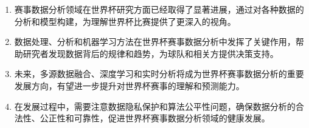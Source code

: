 \documentclass{beamer}
\begin{document}
	
			\begin{frame}
				\begin{enumerate}[label=\arabic*.]
					\item 赛事数据分析领域在世界杯研究方面已经取得了显著进展，通过对各种数据的分析和模型构建，为理解世界杯比赛提供了更深入的视角。
					\item 数据处理、分析和机器学习方法在世界杯赛事数据分析中发挥了关键作用，帮助研究者发现数据背后的规律和趋势，为球队和相关方提供决策支持。
					\item 未来，多源数据融合、深度学习和实时分析将成为世界杯赛事数据分析的重要发展方向，有望进一步提升对世界杯赛事的理解和预测能力。
					\item 在发展过程中，需要注意数据隐私保护和算法公平性问题，确保数据分析的合法性、公正性和可靠性，促进世界杯赛事数据分析领域的健康发展。
				\end{enumerate}
			\end{frame}
			
			
\end{document}

